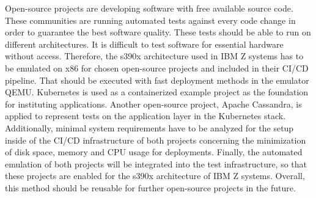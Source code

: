 Open-source projects are developing software with free available source code. These communities are running automated tests against every code change in order to guarantee the best software quality. 
These tests should be able to run on different architectures. It is difficult to test software for essential hardware without access. Therefore, the \gls{s390x} architecture used in IBM \gls{Z systems} has to be emulated on x86 for chosen open-source projects and included in their \gls{CI/CD} pipeline. 
That should be executed with fast deployment methods in the \gls{emulator} QEMU. 
Kubernetes is used as a \gls{containerized} example project as the foundation for instituting applications. Another open-source project, Apache Cassandra, is applied to represent tests on the \gls{application layer} in the Kubernetes stack. \\
Additionally, minimal system requirements have to be analyzed for the setup inside of the CI/CD infrastructure of both projects concerning the minimization of disk space, memory and CPU usage for deployments. Finally, the automated emulation of both projects will be integrated into the test infrastructure, so that these projects are enabled for the s390x architecture of IBM Z systems. Overall, this method should be reusable for further open-source projects in the future.


